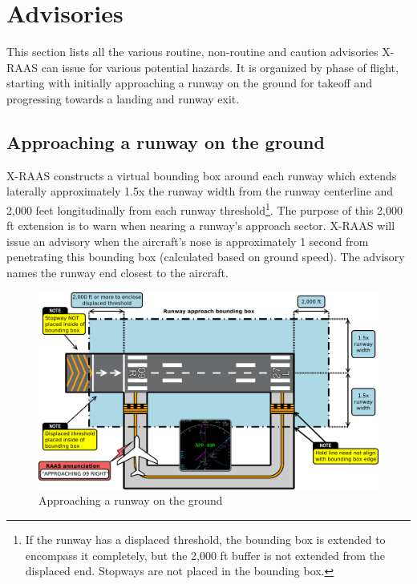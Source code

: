 \documentclass[a4paper,12pt]{article}
\begin{document}
\newpage

\section{Advisories}

This section lists all the various routine, non-routine and caution
advisories X-RAAS can issue for various potential hazards. It is
organized by phase of flight, starting with initially approaching a
runway on the ground for takeoff and progressing towards a landing and
runway exit.

\subsection{Approaching a runway on the ground}
\label{subsec:ApchGndMon}

X-RAAS constructs a virtual bounding box around each runway which extends
laterally approximately 1.5x the runway width from the runway centerline
and 2,000 feet longitudinally from each runway threshold\footnote{If the
runway has a displaced threshold, the bounding box is extended to
encompass it completely, but the 2,000 ft buffer is not extended from the
displaced end. Stopways are not placed in the bounding box.}. The purpose
of this 2,000 ft extension is to warn when nearing a runway's approach
sector. X-RAAS will issue an advisory when the aircraft's nose is
approximately 1 second from penetrating this bounding box (calculated
based on ground speed). The advisory names the runway end closest to the
aircraft.

\begin{figure}[H]
\begin{center}
\includegraphics[width=\textwidth]{../src/apch.pdf}
\end{center}
\caption{Approaching a runway on the ground}
\end{figure}
\end{document}
